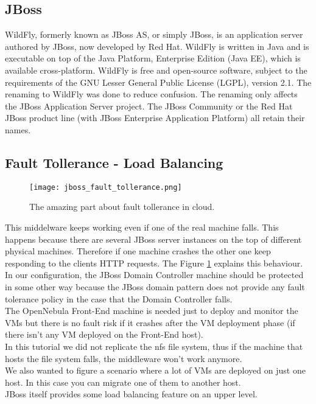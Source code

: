 \documentclass[11pt,a4paper]{article}
\begin{document}
\subsection{JBoss}
WildFly, formerly known as JBoss AS, or simply JBoss, is an application server authored by JBoss, now developed by Red Hat. WildFly is written in Java and is executable on top of the Java Platform, Enterprise Edition (Java EE), which is available cross-platform.
WildFly is free and open-source software, subject to the requirements of the GNU Lesser General Public License (LGPL), version 2.1.
The renaming to WildFly was done to reduce confusion. The renaming only affects the JBoss Application Server project. The JBoss Community or the Red Hat JBoss product line (with JBoss Enterprise Application Platform) all retain their names.\cite{JBossInfo}
\FloatBarrier


\subsection{Fault Tollerance - Load Balancing}

\begin{figure}[ht]
\centering
\texttt{[image: jboss\_fault\_tollerance.png]}
\caption{\label{fig:fault tollerance} The amazing part about fault tollerance in cloud.}
\end{figure}
This middelware keeps working even if one of the real machine falls. This happens  because there are several JBoss server instances on the top of different physical machines. Therefore if one machine crashes the other one keep responding to the clients HTTP requests. The Figure \ref{fig:fault tollerance} explains this behaviour.\\
In our configuration, the JBoss Domain Controller machine should be protected in some other way because the JBoss domain pattern does not provide any fault tolerance policy in the case that the Domain Controller falls.\\
The OpenNebula Front-End machine is needed just to deploy and monitor the VMs but there is no fault risk if it crashes after the VM deployment phase (if there isn't any VM deployed on the Front-End host).\\
In this tutorial we did not replicate the nfs file system, thus if the machine that hosts the file system falls, the middleware won't work anymore.\\
We also wanted to figure a scenario where a lot of VMs are deployed on just one host. In this case you can migrate one of them to another host.\\
JBoss itself provides some load balancing feature on an upper level.
\FloatBarrier
\end{document}
